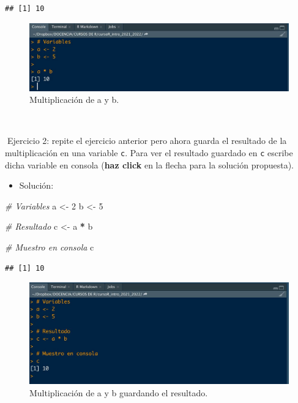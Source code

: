 \documentclass[11pt,]{book}
\newenvironment{Shaded}{\begin{snugshade}}{\end{snugshade}}
\newcommand{\CommentTok}[1]{\textcolor[rgb]{0.37,0.37,0.37}{\textit{#1}}}
\newcommand{\DecValTok}[1]{\textcolor[rgb]{0.06,0.06,0.06}{#1}}
\newcommand{\NormalTok}[1]{#1}
\newcommand{\OperatorTok}[1]{\textcolor[rgb]{0.43,0.43,0.43}{\textbf{#1}}}
\newcommand{\StringTok}[1]{\textcolor[rgb]{0.5,0.5,0.5}{#1}}
\providecommand{\tightlist}{%
  \setlength{\itemsep}{0pt}\setlength{\parskip}{0pt}}
\begin{document}
\begin{verbatim}
## [1] 10
\end{verbatim}

\begin{figure}

{\centering \includegraphics[width=0.8\linewidth]{./img/consola_multiplicacion} 

}

\caption{Multiplicación de a y b.}\label{fig:consola-multi}
\end{figure}

~

📝Ejercicio 2: repite el ejercicio anterior pero ahora guarda el resultado de la multiplicación en una variable \texttt{c}. Para ver el resultado guardado en \texttt{c} escribe dicha variable en consola (\textbf{haz click} en la flecha para la solución propuesta).

\begin{itemize}
\tightlist
\item
  Solución:
\end{itemize}

\begin{Shaded}
\begin{Highlighting}[]
\CommentTok{# Variables}
\NormalTok{a <-}\StringTok{ }\DecValTok{2}
\NormalTok{b <-}\StringTok{ }\DecValTok{5}

\CommentTok{# Resultado}
\NormalTok{c <-}\StringTok{ }\NormalTok{a }\OperatorTok{*}\StringTok{ }\NormalTok{b}

\CommentTok{# Muestro en consola}
\NormalTok{c}
\end{Highlighting}
\end{Shaded}

\begin{verbatim}
## [1] 10
\end{verbatim}

\begin{figure}

{\centering \includegraphics[width=0.8\linewidth]{./img/consola_multiplicacion_2} 

}

\caption{Multiplicación de a y b guardando el resultado.}\label{fig:consola-multi-2}
\end{figure}
\end{document}
